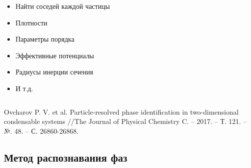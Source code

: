 \documentclass[pdf,hyperref={unicode}]{beamer}
\begin{document}
\begin{frame}
\begin{columns}
\begin{column}{0.47\linewidth}
\tiny{
\begin{itemize}
\item Найти соседей каждой частицы
\item Плотности
\item Параметры порядка
\item Эффективные потенциалы
\item Радиусы инерции сечения
\item И т.д.
\end{itemize}
}
\end{column}


\end{columns}

\vspace{5mm}
\tiny{
Ovcharov P. V. et al. Particle-resolved phase identification in two-dimensional condensable systems //The Journal of Physical Chemistry C. – 2017. – Т. 121. – №. 48. – С. 26860-26868.
}
\end{frame}


\subsection{Метод распознавания фаз}
\end{document}

